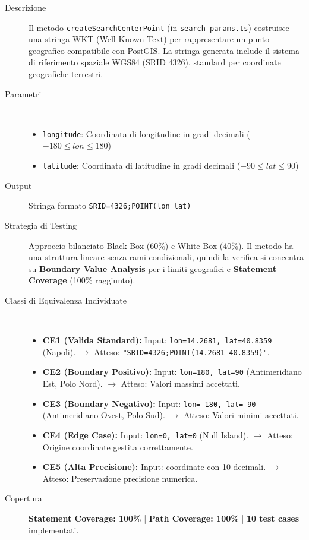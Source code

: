 \begin{description}
    \item[Descrizione] Il metodo \texttt{createSearchCenterPoint} (in \texttt{search-params.ts}) costruisce una stringa WKT (Well-Known Text) per rappresentare un punto geografico compatibile con PostGIS. La stringa generata include il sistema di riferimento spaziale WGS84 (SRID 4326), standard per coordinate geografiche terrestri.
    
    \item[Parametri] ~\\
    \begin{itemize}
        \item \texttt{longitude}: Coordinata di longitudine in gradi decimali ($-180 \leq lon \leq 180$)
        \item \texttt{latitude}: Coordinata di latitudine in gradi decimali ($-90 \leq lat \leq 90$)
    \end{itemize}
    
    \item[Output] Stringa formato \texttt{SRID=4326;POINT(lon lat)}
    
    \item[Strategia di Testing] Approccio bilanciato Black-Box (60\%) e White-Box (40\%). Il metodo ha una struttura lineare senza rami condizionali, quindi la verifica si concentra su \textbf{Boundary Value Analysis} per i limiti geografici e \textbf{Statement Coverage} (100\% raggiunto).
    
    \item[Classi di Equivalenza Individuate] ~\\
    \begin{itemize}
        \item \textbf{CE1 (Valida Standard):} Input: \texttt{lon=14.2681, lat=40.8359} (Napoli). $\rightarrow$ Atteso: \texttt{"SRID=4326;POINT(14.2681 40.8359)"}.
        \item \textbf{CE2 (Boundary Positivo):} Input: \texttt{lon=180, lat=90} (Antimeridiano Est, Polo Nord). $\rightarrow$ Atteso: Valori massimi accettati.
        \item \textbf{CE3 (Boundary Negativo):} Input: \texttt{lon=-180, lat=-90} (Antimeridiano Ovest, Polo Sud). $\rightarrow$ Atteso: Valori minimi accettati.
        \item \textbf{CE4 (Edge Case):} Input: \texttt{lon=0, lat=0} (Null Island). $\rightarrow$ Atteso: Origine coordinate gestita correttamente.
        \item \textbf{CE5 (Alta Precisione):} Input: coordinate con 10 decimali. $\rightarrow$ Atteso: Preservazione precisione numerica.
    \end{itemize}
    
    \item[Copertura] \textbf{Statement Coverage: 100\%} | \textbf{Path Coverage: 100\%} | \textbf{10 test cases} implementati.
\end{description}

